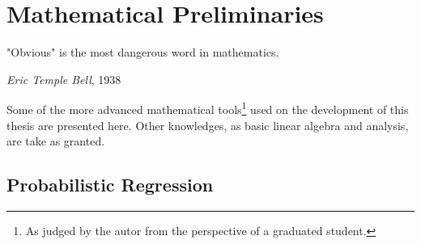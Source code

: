 \chapter{Mathematical Preliminaries}

\epigraph{"Obvious" is the most dangerous word in mathematics.}{\textit{Eric Temple
Bell}, 1938}

Some of the more advanced mathematical tools\footnote{As judged by the autor
from the perspective of a graduated student.} used on the development of this
thesis are presented here.
Other knowledges, as basic linear algebra and analysis, are take as granted.



\section{Probabilistic Regression}